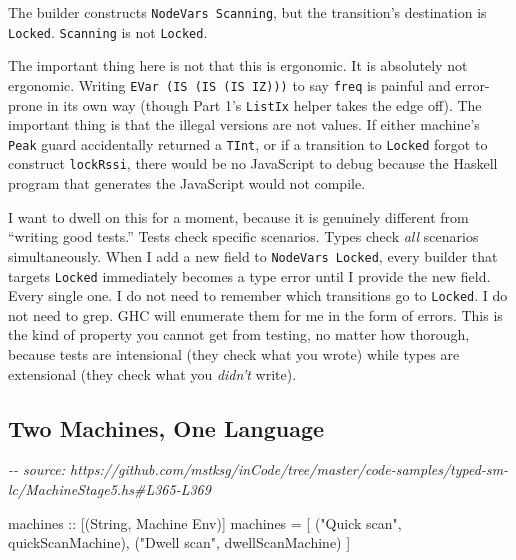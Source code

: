 \documentclass[]{article}
\newenvironment{Shaded}{}{}
\newcommand{\CommentTok}[1]{\textcolor[rgb]{0.38,0.63,0.69}{\textit{#1}}}
\newcommand{\DataTypeTok}[1]{\textcolor[rgb]{0.56,0.13,0.00}{#1}}
\newcommand{\NormalTok}[1]{#1}
\newcommand{\OtherTok}[1]{\textcolor[rgb]{0.00,0.44,0.13}{#1}}
\newcommand{\StringTok}[1]{\textcolor[rgb]{0.25,0.44,0.63}{#1}}
\begin{document}
The builder constructs \texttt{NodeVars\ Scanning}, but the transition's
destination is \texttt{Locked}. \texttt{Scanning} is not \texttt{Locked}.

The important thing here is not that this is ergonomic. It is absolutely not
ergonomic. Writing \texttt{EVar\ (IS\ (IS\ (IS\ IZ)))} to say \texttt{freq} is
painful and error-prone in its own way (though Part 1's \texttt{ListIx} helper
takes the edge off). The important thing is that the illegal versions are not
values. If either machine's \texttt{Peak} guard accidentally returned a
\texttt{TInt}, or if a transition to \texttt{Locked} forgot to construct
\texttt{lockRssi}, there would be no JavaScript to debug because the Haskell
program that generates the JavaScript would not compile.

I want to dwell on this for a moment, because it is genuinely different from
``writing good tests.'' Tests check specific scenarios. Types check \emph{all}
scenarios simultaneously. When I add a new field to \texttt{NodeVars\ Locked},
every builder that targets \texttt{Locked} immediately becomes a type error
until I provide the new field. Every single one. I do not need to remember which
transitions go to \texttt{Locked}. I do not need to grep. GHC will enumerate
them for me in the form of errors. This is the kind of property you cannot get
from testing, no matter how thorough, because tests are intensional (they check
what you wrote) while types are extensional (they check what you \emph{didn't}
write).

\subsection{Two Machines, One Language}\label{two-machines-one-language}

\begin{Shaded}
\begin{Highlighting}[]
\CommentTok{{-}{-} source: https://github.com/mstksg/inCode/tree/master/code{-}samples/typed{-}sm{-}lc/MachineStage5.hs\#L365{-}L369}

\OtherTok{machines ::}\NormalTok{ [(}\DataTypeTok{String}\NormalTok{, }\DataTypeTok{Machine} \DataTypeTok{Env}\NormalTok{)]}
\NormalTok{machines }\OtherTok{=}
\NormalTok{  [ (}\StringTok{"Quick scan"}\NormalTok{, quickScanMachine),}
\NormalTok{    (}\StringTok{"Dwell scan"}\NormalTok{, dwellScanMachine)}
\NormalTok{  ]}
\end{Highlighting}
\end{Shaded}
\end{document}
